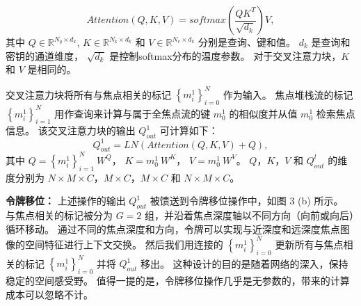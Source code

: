 %
%
%
\begin{equation}
	Attention(Q,K,V) = softmax \left ( \frac{QK^{T}}{\sqrt{d_{k}}} \right ) V,
\end{equation}
%
%
其中
$ Q \in \mathbb{R}^{N_{q}\times d_{k}}  $,
$ K \in \mathbb{R}^{N_{k}\times d_{k}}  $ 和
$ V \in \mathbb{R}^{N_{v}\times d_{k}}  $ 
分别是查询、键和值。 
$ d_{k} $ 是查询和密钥的通道维度，
$ \sqrt{d_{k}} $ 是控制softmax分布的温度参数。 
对于交叉注意力块，$K$ 和 $V$ 是相同的。 
%
%
%
%
%
\par
%
%
%
%
交叉注意力块将所有与焦点相关的标记 $ \left \{ m_{i}^{1} \right \}_{i=0}^{N} $ 作为输入。 焦点堆栈流的标记 $ \left \{  m_{i}^{1} \right \}_{i=1}^{N} $ 用作查询来计算与属于全焦点流的键 $ m_{0}^{1} $ 的相似度并从值 $ m_{0}^{1} $ 检索焦点信息。 该交叉注意力块的输出 $ Q_{out}^{1} $ 可计算如下：
%
%
\begin{equation}
	Q_{out}^{1} = LN \left ( Attention(Q,K,V) + Q \right ),
\end{equation}
%
%
其中
$ Q = \left \{ m_{i}^{1} \right \}_{i=1}^{N}~ W^{Q}$，
$ K= m_{0}^{1} ~W^{K} $，
$ V =  m_{0}^{1}~ W^{V} $。
$ Q$，$K$，$V$ 和 $ Q_{out}^{l} $
的维度分别为 
$ N \times M \times C $，$ M \times C $，$ M \times C $ 
和
 $ N \times M \times C $。 
%
%
%
\par
%
%
%
\textbf{令牌移位：}
%
%
上述操作的输出 $ Q_{out}^{1} $ 被馈送到令牌移位操作中，如图 3 (b) 所示。 与焦点相关的标记被分为 $G = 2$ 组，并沿着焦点深度轴以不同方向（向前或向后）循环移动。 
通过不同的焦点深度和方向，令牌可以实现与近深度和远深度焦点图像的空间特征进行上下文交换。 
然后我们用连接的 $ \left \{ m_{i}^{1} \right \}_{i=0}^{N} $ 更新所有与焦点相关的标记  $ \left \{ m_{i}^{1} \right \}_{i=0}^{N} $ 并将 
$ Q_{out}^{1} $ 移出。 这种设计的目的是随着网络的深入，保持稳定的空间感受野。 值得一提的是，令牌移位操作几乎是无参数的，带来的计算成本可以忽略不计。




